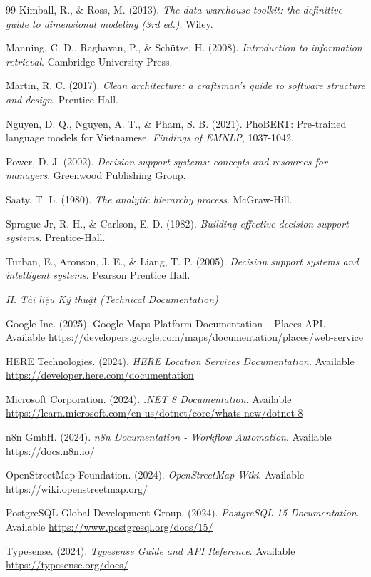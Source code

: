 \begin{thebibliography}{99}
    Kimball, R., \& Ross, M. (2013). \textit{The data warehouse toolkit: the definitive guide to dimensional modeling (3rd ed.)}. Wiley.

    Manning, C. D., Raghavan, P., \& Schütze, H. (2008). \textit{Introduction to information retrieval}. Cambridge University Press.

    Martin, R. C. (2017). \textit{Clean architecture: a craftsman's guide to software structure and design}. Prentice Hall.

    Nguyen, D. Q., Nguyen, A. T., \& Pham, S. B. (2021). PhoBERT: Pre-trained language models for Vietnamese. \textit{Findings of EMNLP}, 1037-1042.

    Power, D. J. (2002). \textit{Decision support systems: concepts and resources for managers}. Greenwood Publishing Group.

    Saaty, T. L. (1980). \textit{The analytic hierarchy process}. McGraw-Hill.

    Sprague Jr, R. H., \& Carlson, E. D. (1982). \textit{Building effective decision support systems}. Prentice-Hall.

    Turban, E., Aronson, J. E., \& Liang, T. P. (2005). \textit{Decision support systems and intelligent systems}. Pearson Prentice Hall.

    \item[] \textit{II. Tài liệu Kỹ thuật (Technical Documentation)}

    Google Inc. (2025). Google Maps Platform Documentation – Places API. Available \url{https://developers.google.com/maps/documentation/places/web-service} 

    HERE Technologies. (2024). \textit{HERE Location Services Documentation}. Available \url{https://developer.here.com/documentation}

    Microsoft Corporation. (2024). \textit{.NET 8 Documentation}. Available \url{https://learn.microsoft.com/en-us/dotnet/core/whats-new/dotnet-8}

    n8n GmbH. (2024). \textit{n8n Documentation - Workflow Automation}. Available \url{https://docs.n8n.io/}

    OpenStreetMap Foundation. (2024). \textit{OpenStreetMap Wiki}. Available \url{https://wiki.openstreetmap.org/}

    PostgreSQL Global Development Group. (2024). \textit{PostgreSQL 15 Documentation}. Available \url{https://www.postgresql.org/docs/15/}

    Typesense. (2024). \textit{Typesense Guide and API Reference}. Available \url{https://typesense.org/docs/}

\end{thebibliography}